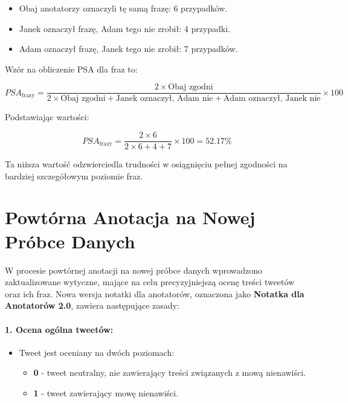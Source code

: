 \documentclass[12pt]{article}
\begin{document}
\begin{itemize}
    \item Obaj anotatorzy oznaczyli tę samą frazę: 6 przypadków.
    \item Janek oznaczył frazę, Adam tego nie zrobił: 4 przypadki.
    \item Adam oznaczył frazę, Janek tego nie zrobił: 7 przypadków.
\end{itemize}

Wzór na obliczenie PSA dla fraz to:

\begin{dmath}
PSA_{\text{frazy}} = \frac{2 \times \text{Obaj zgodni}}{2 \times \text{Obaj zgodni} + \text{Janek oznaczył, Adam nie} + \text{Adam oznaczył, Janek nie}} \times 100
\end{dmath}

Podstawiając wartości:

\begin{dmath}
PSA_{\text{frazy}} = \frac{2 \times 6}{2 \times 6 + 4 + 7} \times 100 = 52.17\%
\end{dmath}

Ta niższa wartość odzwierciedla trudności w osiągnięciu pełnej zgodności na bardziej szczegółowym poziomie fraz.

\section{Powtórna Anotacja na Nowej Próbce Danych}

W procesie powtórnej anotacji na nowej próbce danych wprowadzono zaktualizowane wytyczne, mające na celu precyzyjniejszą ocenę treści tweetów oraz ich fraz. Nowa wersja notatki dla anotatorów, oznaczona jako \textbf{Notatka dla Anotatorów 2.0}, zawiera następujące zasady:

\paragraph{1. Ocena ogólna tweetów:}
\begin{itemize}
    \item Tweet jest oceniany na dwóch poziomach:
    \begin{itemize}
        \item \textbf{0} - tweet neutralny, nie zawierający treści związanych z mową nienawiści.
        \item \textbf{1} - tweet zawierający mowę nienawiści.
    \end{itemize}
\end{itemize}
\end{document}
